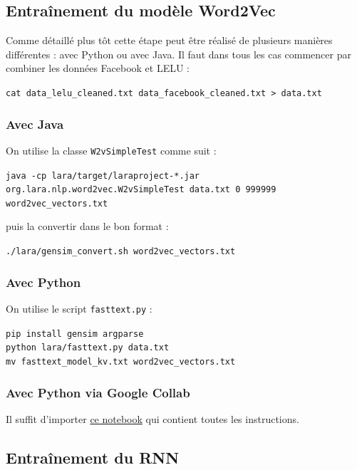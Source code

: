 \documentclass[10pt,a4paper]{article}
\begin{document}
\subsection{Entraînement du modèle Word2Vec}
Comme détaillé plus tôt cette étape peut être réalisé de plusieurs manières différentes : avec Python ou avec Java. Il faut dans tous les cas commencer par combiner les données Facebook et LELU :
\begin{center}
\texttt{cat data\_lelu\_cleaned.txt data\_facebook\_cleaned.txt > data.txt}
\end{center}
\subsubsection{Avec Java}
On utilise la classe \texttt{W2vSimpleTest} comme suit :
\begin{center}
\texttt{java -cp lara/target/laraproject-*.jar org.lara.nlp.word2vec.W2vSimpleTest data.txt 0 999999 word2vec\_vectors.txt}
\end{center}
puis la convertir dans le bon format :
\begin{center}
\texttt{./lara/gensim\_convert.sh word2vec\_vectors.txt}
\end{center}
\subsubsection{Avec Python}
On utilise le script \texttt{fasttext.py} :
\begin{center}
\texttt{pip install gensim argparse} \\
\texttt{python lara/fasttext.py data.txt} \\
\texttt{mv fasttext\_model\_kv.txt word2vec\_vectors.txt}
\end{center}
\subsubsection{Avec Python via Google Collab}
Il suffit d'importer \href{https://github.com/LaraProject/notebooks/blob/master/LaraProject_Word2Vec.ipynb}{ce notebook} qui contient toutes les instructions.
\subsection{Entraînement du RNN}
\end{document}
